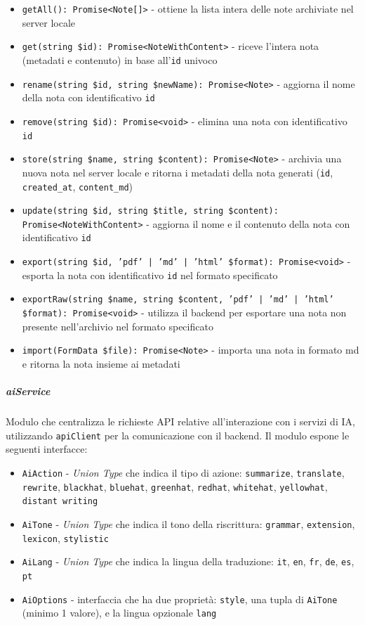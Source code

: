 \documentclass[a4paper,10pt]{article}
\begin{document}
\begin{itemize}
    \item \texttt{getAll(): Promise<Note[]>} - ottiene la lista intera delle note archiviate nel server locale
    \item \texttt{get(string \$id): Promise<NoteWithContent>} - riceve l'intera nota (metadati e contenuto) in base all'\texttt{id} univoco
    \item \texttt{rename(string \$id, string \$newName): Promise<Note>} - aggiorna il nome della nota con identificativo \texttt{id}
    \item \texttt{remove(string \$id): Promise<void>} - elimina una nota con identificativo \texttt{id}
    \item \texttt{store(string \$name, string \$content): Promise<Note>} - archivia una nuova nota nel server locale e ritorna i metadati della nota generati (\texttt{id}, \texttt{created\_at}, \texttt{content\_md})
    \item \texttt{update(string \$id, string \$title, string \$content): Promise<NoteWithContent>} - aggiorna il nome e il contenuto della nota con identificativo \texttt{id}
    \item \texttt{export(string \$id, 'pdf' | 'md' | 'html' \$format): Promise<void>} - esporta la nota con identificativo \texttt{id} nel formato specificato
    \item \texttt{exportRaw(string \$name, string \$content, 'pdf' | 'md' | 'html' \$format): Promise<void>} - utilizza il backend per esportare una nota non presente nell'archivio nel formato specificato
    \item \texttt{import(FormData \$file): Promise<Note>} - importa una nota in formato md e ritorna la nota insieme ai metadati
\end{itemize}
\subparagraph{aiService} Modulo che centralizza le richieste API relative all'interazione con i servizi di IA, utilizzando \texttt{apiClient} per la comunicazione con il backend. Il modulo espone le seguenti interfacce:
\begin{itemize}
    \item \texttt{AiAction} - \textit{Union Type} che indica il tipo di azione: \texttt{summarize}, \texttt{translate}, \texttt{rewrite}, \texttt{blackhat}, \texttt{bluehat}, \texttt{greenhat}, \texttt{redhat}, \texttt{whitehat}, \texttt{yellowhat}, \texttt{distant writing}
    \item \texttt{AiTone} - \textit{Union Type} che indica il tono della riscrittura: \texttt{grammar}, \texttt{extension}, \texttt{lexicon}, \texttt{stylistic}
    \item \texttt{AiLang} - \textit{Union Type} che indica la lingua della traduzione: \texttt{it}, \texttt{en}, \texttt{fr}, \texttt{de}, \texttt{es}, \texttt{pt}
    \item \texttt{AiOptions} - interfaccia che ha due proprietà: \texttt{style}, una tupla di \texttt{AiTone} (minimo 1 valore), e la lingua opzionale \texttt{lang}
\end{itemize}
\end{document}
